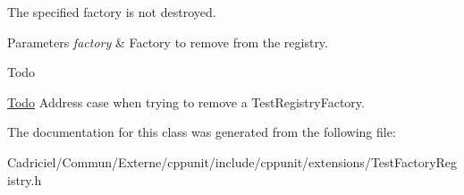 The specified factory is not destroyed. 
\begin{DoxyParams}{Parameters}
{\em factory} & Factory to remove from the registry. \\
\hline
\end{DoxyParams}
\begin{DoxyRefDesc}{Todo}
\item[\hyperlink{todo__todo000001}{Todo}]Address case when trying to remove a Test\+Registry\+Factory. \end{DoxyRefDesc}


The documentation for this class was generated from the following file\+:\begin{DoxyCompactItemize}
\item 
Cadriciel/\+Commun/\+Externe/cppunit/include/cppunit/extensions/Test\+Factory\+Registry.\+h\end{DoxyCompactItemize}
